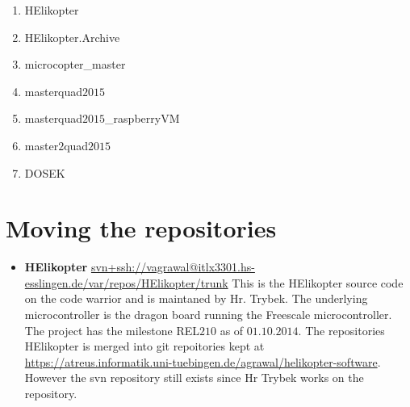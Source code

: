 \begin{enumerate}
  \item HElikopter
  \item HElikopter.Archive
  \item microcopter\_master
  \item masterquad$2015$
  \item masterquad$2015$\_raspberryVM
  \item master$2$quad$2015$
  \item DOSEK
\end{enumerate}

\section{Moving the repositories}
\begin{itemize} 
  \item
  \textbf{HElikopter}
  \url{svn+ssh://vagrawal@itlx3301.hs-esslingen.de/var/repos/HElikopter/trunk} This is the HElikopter source code on the code warrior and is maintaned by Hr.
  Trybek. The underlying microcontroller is the dragon board running the
  Freescale microcontroller. The project has the milestone REL$210$ as of
  $01.10.2014$.
  The repositories HElikopter is merged into git repoitories kept at
  \url{https://atreus.informatik.uni-tuebingen.de/agrawal/helikopter-software}.
  However the svn repository still exists since Hr Trybek works on the
  repository.
  

\end{itemize}
